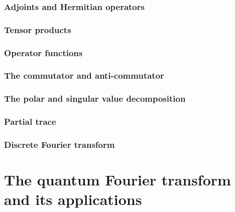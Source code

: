\documentclass[
	11pt, %
	a4paper, %
]{LegrandOrangeBook}
\begin{document}
\subsection{Adjoints and Hermitian operators} %


\subsection{Tensor products} %


\subsection{Operator functions} %


\subsection{The commutator and anti-commutator} %


\subsection{The polar and singular value decomposition} %


\subsection{Partial trace} %


\subsection{Discrete Fourier transform} %



\chapter{The quantum Fourier transform and its applications}
\end{document}
